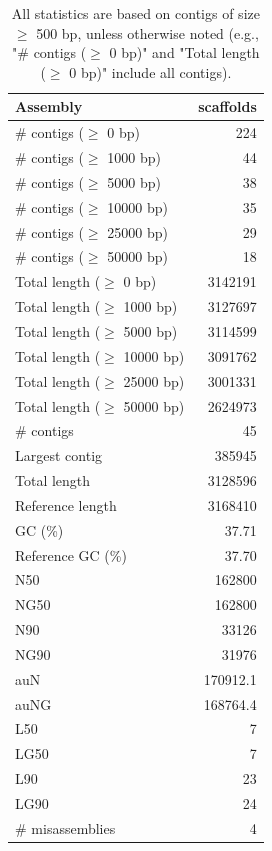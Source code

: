 \documentclass[12pt,a4paper]{article}
\begin{document}
\begin{table}[ht]
\begin{center}
\caption{All statistics are based on contigs of size $\geq$ 500 bp, unless otherwise noted (e.g., "\# contigs ($\geq$ 0 bp)" and "Total length ($\geq$ 0 bp)" include all contigs).}
\begin{tabular}{|l*{1}{|r}|}
\hline
Assembly & scaffolds \\ \hline
\# contigs ($\geq$ 0 bp) & 224 \\ \hline
\# contigs ($\geq$ 1000 bp) & 44 \\ \hline
\# contigs ($\geq$ 5000 bp) & 38 \\ \hline
\# contigs ($\geq$ 10000 bp) & 35 \\ \hline
\# contigs ($\geq$ 25000 bp) & 29 \\ \hline
\# contigs ($\geq$ 50000 bp) & 18 \\ \hline
Total length ($\geq$ 0 bp) & 3142191 \\ \hline
Total length ($\geq$ 1000 bp) & 3127697 \\ \hline
Total length ($\geq$ 5000 bp) & 3114599 \\ \hline
Total length ($\geq$ 10000 bp) & 3091762 \\ \hline
Total length ($\geq$ 25000 bp) & 3001331 \\ \hline
Total length ($\geq$ 50000 bp) & 2624973 \\ \hline
\# contigs & 45 \\ \hline
Largest contig & 385945 \\ \hline
Total length & 3128596 \\ \hline
Reference length & 3168410 \\ \hline
GC (\%) & 37.71 \\ \hline
Reference GC (\%) & 37.70 \\ \hline
N50 & 162800 \\ \hline
NG50 & 162800 \\ \hline
N90 & 33126 \\ \hline
NG90 & 31976 \\ \hline
auN & 170912.1 \\ \hline
auNG & 168764.4 \\ \hline
L50 & 7 \\ \hline
LG50 & 7 \\ \hline
L90 & 23 \\ \hline
LG90 & 24 \\ \hline
\# misassemblies & 4 \\ \hline

\end{tabular}
\end{center}
\end{table}
\end{document}
